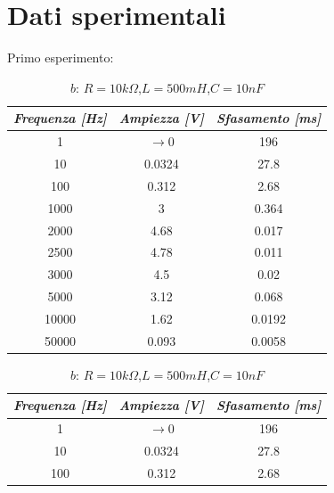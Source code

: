     \section{Dati sperimentali}
    Primo esperimento:
    \begin{table} [!htb]
        \begin{minipage}{.32\linewidth}
            \caption{$a$: $R = 10k\Omega$,$L = 500mH $,$C = 10nF$}
            \centering
            \begin{tabular}{|c|c|c|}
                \hline
                \textit{Frequenza [Hz]} & \textit{Ampiezza [V]} & \textit{Sfasamento [ms]} \\
                \hline
                1 & $\longrightarrow 0$ & 196 \\
                \hline
                10 & 0.0324 & 27.8 \\
                \hline
                100 & 0.312 & 2.68 \\
                \hline
                1000 & 3 & 0.364 \\
                \hline
                2000 & 4.68 & 0.017 \\
                \hline
                2500 & 4.78 & 0.011 \\
                \hline
                3000 & 4.5 & 0.02 \\
                \hline
                5000 & 3.12 & 0.068 \\
                \hline
                10000 & 1.62 & 0.0192 \\
                \hline
                50000 & 0.093 & 0.0058 \\
                \hline
            \end{tabular}
        \end{minipage}
        \begin{minipage}{.32\linewidth}
            \caption{$b$: $R = 10k\Omega$,$L = 500mH $,$C = 10nF$}
            \centering
            \begin{tabular}{|c|c|c|}
                \hline
                \textit{Frequenza [Hz]} & \textit{Ampiezza [V]} & \textit{Sfasamento [ms]} \\
                \hline
                1 & $\longrightarrow 0$ & 196 \\
                \hline
                10 & 0.0324 & 27.8 \\
                \hline
                100 & 0.312 & 2.68 \\
                \hline

\end{tabular}
\end{minipage}
\end{table}
